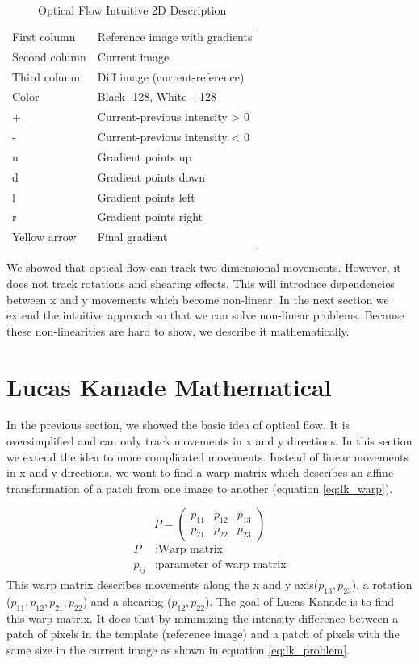 \documentclass[11pt,a4paper,titlepage,oneside]{report}
\begin{document}
\begin{table}[H]
   \centering
   \begin{tabular}{l l}
       First column & Reference image with gradients\\
       Second column & Current image\\
       Third column & Diff image (current-reference)\\
       Color & Black -128, White +128\\
       + & Current-previous intensity > 0\\
       - & Current-previous intensity < 0\\
       u & Gradient points up\\
       d & Gradient points down\\
       l & Gradient points left\\
       r & Gradient points right\\
       Yellow arrow & Final gradient
  \end{tabular}
   \caption{Optical Flow Intuitive 2D Description}
  \label{tab:optical_flow_2d}
\end{table}

We showed that optical flow can track two dimensional movements. However, it does not track rotations and shearing effects. This will introduce dependencies between x and y movements which become non-linear. In the next section we extend the intuitive approach so that we can solve non-linear problems. Because these non-linearities are hard to show, we describe it mathematically.

\section{Lucas Kanade Mathematical}

In the previous section, we showed the basic idea of optical flow. It is oversimplified and can only track movements in x and y directions. In this section we extend the idea to more complicated movements. Instead of linear movements in x and y directions, we want to find a warp matrix which describes an affine transformation of a patch from one image to another (equation \ref{eq:lk_warp}).

\begin{equation}\label{eq:lk_warp}
  P=\begin{pmatrix}
    p_{11} & p_{12} & p_{13} \\
    p_{21} & p_{22} & p_{23}
  \end{pmatrix}
\end{equation}
\begin{align*}
  P       &:  \text{Warp matrix}\\
  p_{ij}  &:  \text{parameter of warp matrix}
\end{align*}
This warp matrix describes movements along the x and y axis($p_{13},p_{23}$), a rotation ($p_{11},p_{12},p_{21},p_{22}$) and a shearing ($p_{12},p_{22}$). The goal of Lucas Kanade is to find this warp matrix. It does that by minimizing the intensity difference between a patch of pixels in the template (reference image) and a patch of pixels with the same size in the current image as shown in equation \ref{eq:lk_problem}. 
\end{document}
